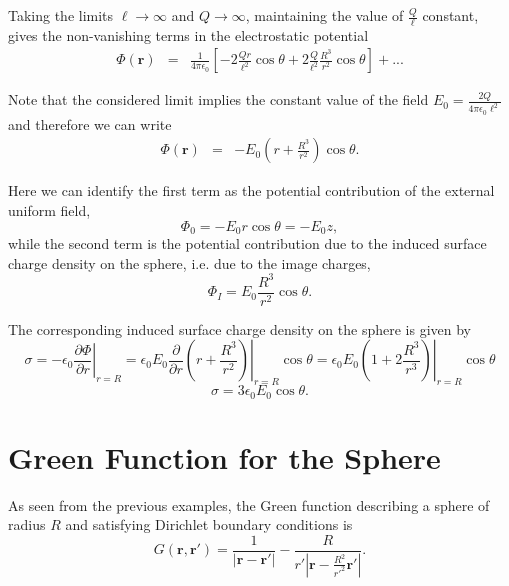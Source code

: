 Taking the limits $\ell \rightarrow \infty$ and $Q \rightarrow \infty$, maintaining the value of $\frac{Q}{\ell}$ constant, gives the non-vanishing terms in the electrostatic potential 
\begin{eqnarray}
\Phi (\textbf{r}) &=& \frac{1}{4 \pi \epsilon_0} \left[   - 2  \frac{Qr}{\ell^2} \cos \theta + 2 \frac{Q }{\ell ^2}  \frac{R^3}{r^2}  \cos \theta  \right] + ...
\end{eqnarray}

Note that the considered  limit implies the constant value of the field $E_0 = \frac{2Q}{4\pi \epsilon_0 \ell ^2}$ and therefore we can write
\begin{eqnarray}
\Phi (\textbf{r}) &=&    - E_0 \left(  r +  \frac{R^3}{r^2} \right) \cos \theta .
\end{eqnarray}

Here we can identify the first term as the potential contribution of the external uniform field, 
\begin{equation}
\Phi_0 = -E_0 r \cos \theta = - E_0 z ,
\end{equation}
while the second term is the potential contribution due to the induced surface charge density on the sphere, i.e. due to the image charges,
\begin{equation}
\Phi_I =  E_0 \frac{R^3}{r^2} \cos \theta.
\end{equation}

The corresponding induced surface charge density on the sphere is given by
\begin{equation}
\sigma = -\epsilon_0 \left. \frac{\partial \Phi}{\partial r} \right|_{r=R} = \epsilon_0 E_0 \left. \frac{\partial}{\partial r} \left(  r +  \frac{R^3}{r^2} \right) \right|_{r=R}  \cos \theta =  \epsilon_0 E_0 \left. \left( 1 + 2\frac{R^3}{r^3} \right) \right|_{r=R} \cos \theta
\end{equation}
\begin{equation}
\sigma =  3 \epsilon_0 E_0  \cos \theta .
\end{equation}

\section{Green Function for the Sphere}
As seen from the previous examples, the Green function describing a sphere of radius $R$ and satisfying Dirichlet boundary conditions is
\begin{equation}
G(\textbf{r} , \textbf{r}') = \frac{1}{\left| \textbf{r} - \textbf{r}' \right|} -  \frac{R}{r' \left| \textbf{r} -\frac{R^2}{r'^2} \textbf{r}' \right|}.
\end{equation}

